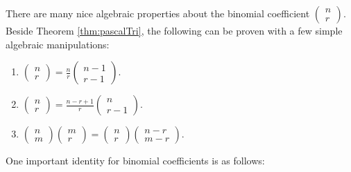 \documentclass[math]{amznotes}
\theoremstyle{remark}
\newcommand{\0}{\mathbf{0}}
\newcommand{\1}{\mathbf{1}}
\begin{document}
There are many nice algebraic properties about the binomial coefficient $\left(\begin{smallmatrix}
    n \\
    r
\end{smallmatrix}\right)$. Beside Theorem \ref{thm:pascalTri}, the following can be proven with a few simple algebraic manipulations:
\begin{enumerate}
    \item $\begin{pmatrix}
        n \\
        r
    \end{pmatrix} = \frac{n}{r}\begin{pmatrix}
        n - 1 \\
        r - 1
    \end{pmatrix}$.
    \item $\begin{pmatrix}
        n \\
        r
    \end{pmatrix} = \frac{n - r + 1}{r}\begin{pmatrix}
        n \\
        r - 1
    \end{pmatrix}$.
    \item $\begin{pmatrix}
        n \\
        m
    \end{pmatrix}\begin{pmatrix}
        m \\
        r
    \end{pmatrix} = \begin{pmatrix}
        n \\
        r
    \end{pmatrix}\begin{pmatrix}
        n - r \\
        m - r
    \end{pmatrix}$.
\end{enumerate}
One important identity for binomial coefficients is as follows:
\end{document}
